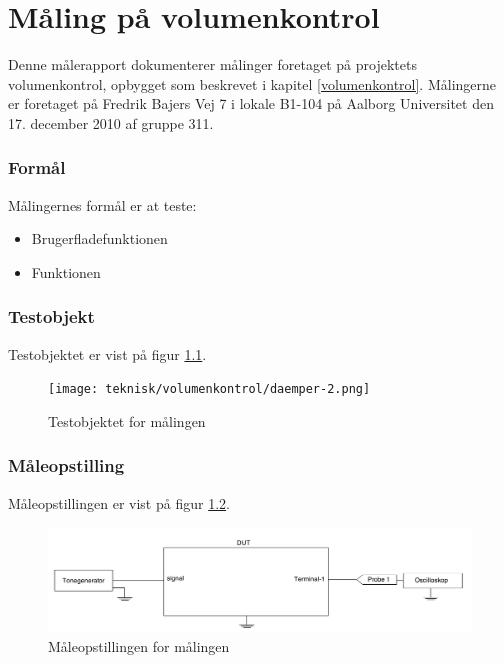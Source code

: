 \chapter{Måling på volumenkontrol}
\label{maalevolumenkontrol}

Denne målerapport dokumenterer målinger foretaget på projektets volumenkontrol, opbygget som beskrevet i kapitel \ref{volumenkontrol}. Målingerne er foretaget på Fredrik Bajers Vej 7 i lokale B1-104 på Aalborg Universitet den 17. december 2010 af gruppe 311.

\subsection*{Formål}
Målingernes formål er at teste:
\begin{itemize}
\item Brugerfladefunktionen
\item Funktionen
\end{itemize}

\subsection*{Testobjekt}

Testobjektet er vist på figur \ref{fig:volumenkontrol_daemper_maale}.

\begin{figure}[h]
\centering
\texttt{[image: teknisk/volumenkontrol/daemper-2.png]}
\caption{Testobjektet for målingen}
\label{fig:volumenkontrol_daemper_maale}
\end{figure}

\clearpage

\subsection*{Måleopstilling}
Måleopstillingen er vist på figur \ref{fig:maaleop-vol}.

\begin{figure}[h]
\centering
\includegraphics[scale=0.3]{maalerapporter/volumenkontrol/opstilling_volumen.png}
\caption{Måleopstillingen for målingen}
\label{fig:maaleop-vol}
\end{figure}

